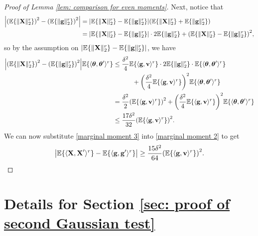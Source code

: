 \documentclass[final,12pt]{colt2018} %
\numberwithin{equation}{section}
\DeclarePairedDelimiter{\abs}{\lvert}{\rvert}
\DeclarePairedDelimiter{\norm}{\lVert}{\rVert}
\DeclarePairedDelimiter{\paren}{(}{)}
\DeclarePairedDelimiter{\braces}{\lbrace}{\rbrace}
\DeclarePairedDelimiter{\inprod}{\langle}{\rangle}
\newcommand{\E}{\mathbb{E}}
\newcommand{\boldg}{\textbf{g}}
\newcommand{\boldv}{\textbf{v}}
\newcommand{\boldtheta}{\boldsymbol{\theta}}
\newcommand{\boldX}{\textbf{X}}
\begin{document}
\begin{proof}[Proof of Lemma \ref{lem: comparison for even moments}]
	Next, notice that
	\begin{align*}
	\abs*{\paren*{\E\braces{\norm{\boldX}_2^r}}^2-\paren*{\E\braces{\norm{\boldg}_2^r}}^2} & = \abs*{\E\braces{\norm{\boldX}_2^r}-\E\braces{\norm{\boldg}_2^r}} \paren*{\E\braces{ \norm{\boldX}_2^r} +\E\braces{ \norm{\boldg}_2^r}} \\
	& = \abs*{\E\braces{\norm{\boldX}_2^r}-\E\braces{\norm{\boldg}_2^r}}\cdot 2\E\braces{ \norm{\boldg}_2^r} + \paren*{\E\braces{\norm{\boldX}_2^r}-\E\braces{\norm{\boldg}_2^r}}^2,
	\end{align*}
	so by the assumption on $\abs*{\E\braces{\norm{\boldX}_2^r}-\E\braces{\norm{\boldg}_2^r}}$, we have
	\begin{align} \label{marginal moment 3}
	\abs*{\paren*{\E\braces{\norm{\boldX}_2^r}}^2-\paren*{\E\braces{\norm{\boldg}_2^r}}^2}\E\braces{\inprod{\boldtheta,\boldtheta'}^r} & \leq \frac{\delta^2}{4}\E\braces{ \inprod{\boldg,\boldv}^r}\cdot2\E\braces{ \norm{\boldg}_2^r}\cdot\E\braces{\inprod{\boldtheta,\boldtheta'}^r} \\ & \quad\quad\quad + \paren*{\frac{\delta^2}{4}\E\braces{ \inprod{\boldg,\boldv}^r}}^2\E\braces{\inprod{\boldtheta,\boldtheta'}^r} \nonumber \\
	& = \frac{\delta^2}{2} \paren*{\E\braces{ \inprod{\boldg,\boldv}^r}}^2 + \paren*{\frac{\delta^2}{4}\E\braces{ \inprod{\boldg,\boldv}^r}}^2\E\braces{\inprod{\boldtheta,\boldtheta'}^r} \nonumber \\
	& \leq \frac{17\delta^2}{32}\paren*{\E\braces{ \inprod{\boldg,\boldv}^r}}^2.
	\end{align}
	We can now substitute \eqref{marginal moment 3} into \eqref{marginal moment 2} to get
	\begin{equation*}
	\abs*{\E\braces{\inprod{\boldX,\boldX'}^r} - \E\braces{\inprod{\boldg,\boldg'}^r}} \geq \frac{15\delta^2}{64}\paren*{\E\braces{ \inprod{\boldg,\boldv}^r}}^2.
	\end{equation*}
\end{proof}

\section{Details for Section \ref{sec: proof of second Gaussian test}} \label{sec: proof of second Gaussian test appendix}
\end{document}
